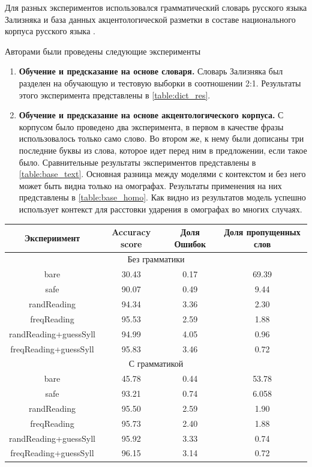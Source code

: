 \documentclass[14pt, a4paper, russian]{report}
\begin{document}
\begin{normalsize}
Для разных экспериментов использовался грамматический словарь русского языка Зализняка \cite{zaliz} и база данных акцентологической разметки в составе национального корпуса русского языка \cite{grishina}. 

Авторами были проведены следующие эксперименты
\begin{enumerate}
	\item \textbf{Обучение и предсказание на основе словаря.} Словарь Зализняка был разделен на обучающую и тестовую выборки в соотношении 2:1. Результаты этого эксперимента представлены в \cref{table:dict_res}.
	\item \textbf{Обучение и предсказание на основе акцентологического корпуса.} С корпусом было проведено два эксперимента, в первом в качестве фразы использовалось только само слово. Во втором же, к нему были дописаны три последние буквы из слова, которое идет перед ним в предложении, если такое было. Сравнительные результаты экспериментов представлены в \cref{table:base_text}. Основная разница между моделями с контекстом и без него может быть видна только на омографах. Результаты применения на них представлены в \cref{table:base_homo}. Как видно из результатов модель успешно использует контекст для расстовки ударения в омографах во многих случаях.
\end{enumerate}

\begin{table}[H]
	\begin{small}
		\begin{center}
			\begin{tabular}{|c|c|c|c|}
				\hline
				Экспериимент & Accuracy score & Доля Ошибок & Доля пропущенных слов\\
				\hline
				\multicolumn{4}{|c|}{Без грамматики} \\			
				\hline
				bare & 30.43 & 0.17 & 69.39 \\
				\hline
				safe & 90.07 & 0.49 & 9.44 \\
				\hline
				randReading &94.34 &3.36 &2.30 \\
				\hline
				freqReading &95.53 &2.59& 1.88 \\
				\hline
				randReading+guessSyll &94.99 &4.05 &0.96 \\
				\hline
				freqReading+guessSyll & 95.83 &3.46 &0.72\\
				\hline
				\multicolumn{4}{|c|}{С грамматикой} \\			
				\hline
				bare &45.78 & 0.44 &53.78\\
				\hline
				safe &93.21& 0.74 &6.058 \\
				\hline
				randReading &95.50 &2.59 &1.90 \\
				\hline
				freqReading &95.73 &2.40 &1.88 \\
				\hline
				randReading+guessSyll &95.92 &3.33 &0.74 \\
				\hline
				freqReading+guessSyll &96.15 &3.14 &0.72 \\
				\hline
				

\end{tabular}
\end{center}
\end{small}
\end{table}
\end{normalsize}
\end{document}
